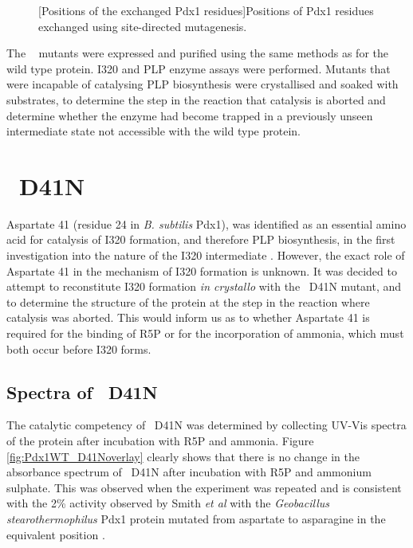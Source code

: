 \begin{figure}[!htbp]
\begin{minipage}{\linewidth}

	[Positions of the exchanged Pdx1 residues]{Positions of Pdx1 residues exchanged using site-directed mutagenesis.\label{fig:Mutant_Positions}}	
\end{minipage}
\end{figure}

The \atpdx~ mutants were expressed and purified using the same methods as for the wild type protein. I320 and PLP enzyme assays were performed. Mutants that were incapable of catalysing PLP biosynthesis were crystallised and soaked with substrates, to determine the step in the reaction that catalysis is aborted and determine whether the enzyme had become trapped in a previously unseen intermediate state not accessible with the wild type protein.
\FloatBarrier
\clearpage

\section{\atpdx ~D41N}
Aspartate 41 (residue 24 in \textit{B. subtilis} Pdx1), was identified as an essential amino acid for catalysis of I320 formation, and therefore PLP biosynthesis, in the first investigation into the nature of the I320 intermediate \cite{Raschle2007}. However, the exact role of Aspartate 41 in the mechanism of I320 formation is unknown. It was decided to attempt to reconstitute I320 formation \textit{in crystallo} with the \atpdx ~D41N mutant, and to determine the structure of the protein at the step in the reaction where catalysis was aborted. This would inform us as to whether Aspartate 41 is required for the binding of R5P or for the incorporation of ammonia, which must both occur before I320 forms.  
\subsection*{Spectra of \atpdx ~D41N}
The catalytic competency of \atpdx ~D41N was determined by collecting UV-Vis spectra of the protein after incubation with R5P and ammonia. Figure \ref{fig:Pdx1WT_D41Noverlay} clearly shows that there is no change in the absorbance spectrum of \atpdx ~D41N after incubation with R5P and ammonium sulphate. This was observed when the experiment was repeated and is consistent with the 2\% activity observed by Smith \textit{et al} with the \textit{Geobacillus stearothermophilus} Pdx1 protein mutated from aspartate to asparagine in the equivalent position \cite{Smith2015}.  

